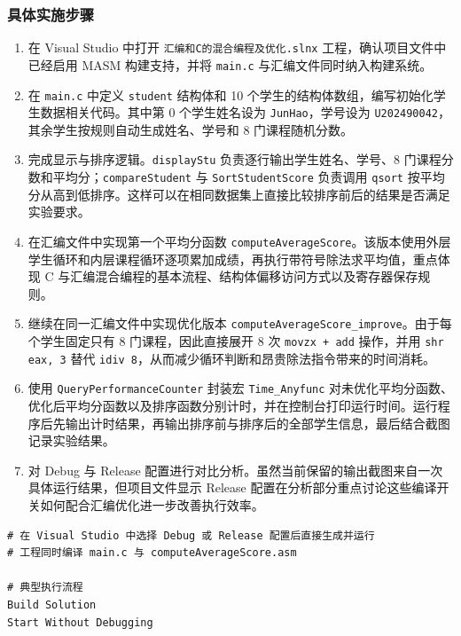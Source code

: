 \documentclass[supercite]{Experimental_Report}
\theoremstyle{definition}
\begin{document}
\subsubsection{具体实施步骤}
\begin{enumerate}
  \item 在 Visual Studio 中打开 \texttt{汇编和C的混合编程及优化.slnx} 工程，确认项目文件中已经启用 MASM 构建支持，并将 \texttt{main.c} 与汇编文件同时纳入构建系统。
  \item 在 \texttt{main.c} 中定义 \texttt{student} 结构体和 10 个学生的结构体数组，编写初始化学生数据相关代码。其中第 0 个学生姓名设为 \texttt{JunHao}，学号设为 \texttt{U202490042}，其余学生按规则自动生成姓名、学号和 8 门课程随机分数。
  \item 完成显示与排序逻辑。\texttt{displayStu} 负责逐行输出学生姓名、学号、8 门课程分数和平均分；\texttt{compareStudent} 与 \texttt{SortStudentScore} 负责调用 \texttt{qsort} 按平均分从高到低排序。这样可以在相同数据集上直接比较排序前后的结果是否满足实验要求。
  \item 在汇编文件中实现第一个平均分函数 \texttt{computeAverageScore}。该版本使用外层学生循环和内层课程循环逐项累加成绩，再执行带符号除法求平均值，重点体现 C 与汇编混合编程的基本流程、结构体偏移访问方式以及寄存器保存规则。
  \item 继续在同一汇编文件中实现优化版本 \texttt{computeAverageScore\_improve}。由于每个学生固定只有 8 门课程，因此直接展开 8 次 \texttt{movzx + add} 操作，并用 \texttt{shr eax, 3} 替代 \texttt{idiv 8}，从而减少循环判断和昂贵除法指令带来的时间消耗。
  \item 使用 \texttt{QueryPerformanceCounter} 封装宏 \texttt{Time\_Anyfunc} 对未优化平均分函数、优化后平均分函数以及排序函数分别计时，并在控制台打印运行时间。运行程序后先输出计时结果，再输出排序前与排序后的全部学生信息，最后结合截图记录实验结果。
  \item 对 Debug 与 Release 配置进行对比分析。虽然当前保留的输出截图来自一次具体运行结果，但项目文件显示 Release 配置在分析部分重点讨论这些编译开关如何配合汇编优化进一步改善执行效率。
\end{enumerate}

\begin{lstlisting}[language=Shell, caption={实验2使用的构建与运行方式}, label={lst:lab2-build}]
# 在 Visual Studio 中选择 Debug 或 Release 配置后直接生成并运行
# 工程同时编译 main.c 与 computeAverageScore.asm

# 典型执行流程
Build Solution
Start Without Debugging
\end{lstlisting}
\end{document}
